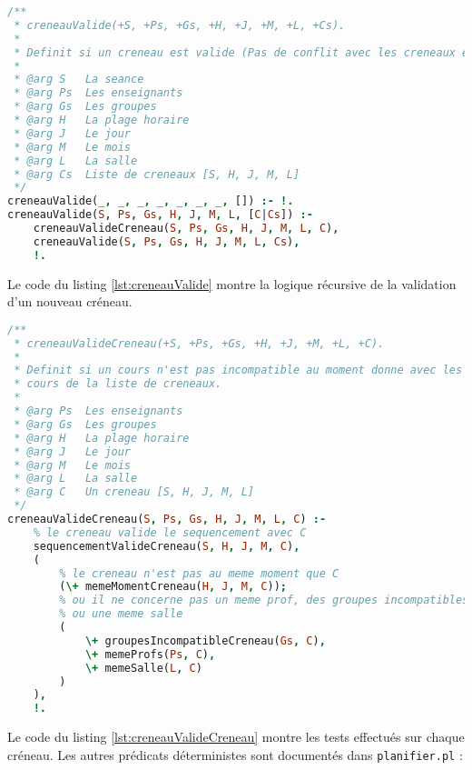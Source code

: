 \begin{lstlisting}[language=Prolog, caption=creneauValide, captionpos=b,
label={lst:creneauValide}]
/**
 * creneauValide(+S, +Ps, +Gs, +H, +J, +M, +L, +Cs).
 *
 * Definit si un creneau est valide (Pas de conflit avec les creneaux existants)
 *
 * @arg S   La seance
 * @arg Ps  Les enseignants
 * @arg Gs  Les groupes
 * @arg H   La plage horaire
 * @arg J   Le jour
 * @arg M   Le mois
 * @arg L   La salle
 * @arg Cs  Liste de creneaux [S, H, J, M, L]
 */
creneauValide(_, _, _, _, _, _, _, []) :- !.
creneauValide(S, Ps, Gs, H, J, M, L, [C|Cs]) :-
    creneauValideCreneau(S, Ps, Gs, H, J, M, L, C),
    creneauValide(S, Ps, Gs, H, J, M, L, Cs),
    !.
\end{lstlisting}

Le code du listing \ref{lst:creneauValide} montre la logique récursive de la
validation d'un nouveau créneau.

\begin{lstlisting}[language=Prolog, caption=creneauValideCreneau, captionpos=b,
label={lst:creneauValideCreneau}]
/**
 * creneauValideCreneau(+S, +Ps, +Gs, +H, +J, +M, +L, +C).
 *
 * Definit si un cours n'est pas incompatible au moment donne avec les autres
 * cours de la liste de creneaux.
 *
 * @arg Ps  Les enseignants
 * @arg Gs  Les groupes
 * @arg H   La plage horaire
 * @arg J   Le jour
 * @arg M   Le mois
 * @arg L   La salle
 * @arg C   Un creneau [S, H, J, M, L]
 */
creneauValideCreneau(S, Ps, Gs, H, J, M, L, C) :-
    % le creneau valide le sequencement avec C
    sequencementValideCreneau(S, H, J, M, C),
    (
        % le creneau n'est pas au meme moment que C
        (\+ memeMomentCreneau(H, J, M, C));
        % ou il ne concerne pas un meme prof, des groupes incompatibles
        % ou une meme salle
        (
            \+ groupesIncompatibleCreneau(Gs, C),
            \+ memeProfs(Ps, C),
            \+ memeSalle(L, C)
        )
    ),
    !.
\end{lstlisting}

Le code du listing \ref{lst:creneauValideCreneau} montre les tests effectués
sur chaque créneau. Les autres prédicats déterministes sont documentés dans
\texttt{planifier.pl} :

